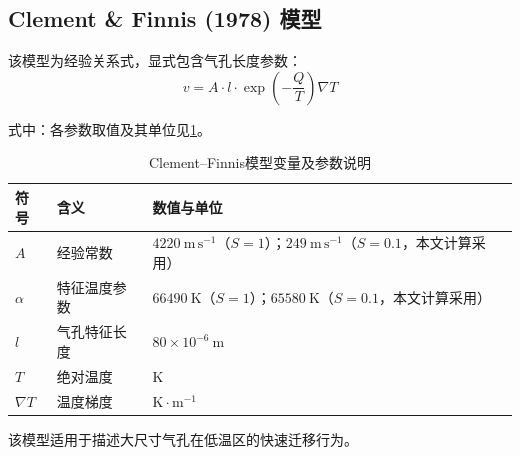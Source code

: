 \subsection{Clement \& Finnis (1978) 模型}

该模型为经验关系式，显式包含气孔长度参数：
\begin{equation}
	v = A \cdot l \cdot \exp\left(-\frac{Q}{T}\right) \nabla T
	\label{eq:app_b_clement_finnis_migration_velocity}
\end{equation}

\noindent 式中：各参数取值及其单位见\tablename\ref{tab:app_b_clement_parameters}。
\begin{table}[htbp]
	\centering
	\caption{Clement--Finnis模型变量及参数说明}
	\label{tab:app_b_clement_parameters}
	\begin{tabularx}{\textwidth}{>{\centering\arraybackslash\hsize=0.8\hsize}X 
			>{\RaggedRight\arraybackslash\hsize=1.0\hsize}X 
			>{\RaggedRight\arraybackslash\hsize=1.2\hsize}X}
		\toprule
		符号 & 含义 & 数值与单位 \\
		\midrule
		$A$ 
		& 经验常数 
		& $4220~\mathrm{m\,s^{-1}}$（$S=1$）；$249~\mathrm{m\,s^{-1}}$（$S=0.1$，本文计算采用） \\
		
		$\alpha$ 
		& 特征温度参数 
		& $66490~\mathrm{K}$（$S=1$）；$65580~\mathrm{K}$（$S=0.1$，本文计算采用） \\
		
		$l$ 
		& 气孔特征长度 
		& $80 \times 10^{-6}\ \mathrm{m}$ \\
		
		$T$ 
		& 绝对温度 
		& $\mathrm{K}$ \\
		
		$\nabla T$ 
		& 温度梯度 
		& $\mathrm{K\cdot m^{-1}}$ \\
		\bottomrule
	\end{tabularx}
\end{table}

该模型适用于描述大尺寸气孔在低温区的快速迁移行为。
